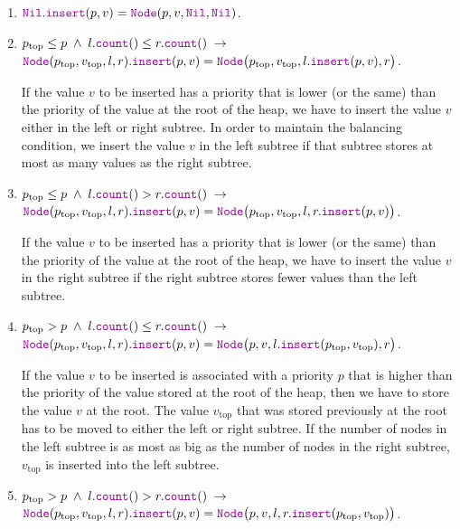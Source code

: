 \begin{enumerate}
\item $\mytt{Nil}.\mytt{insert}(p,v) = \mytt{Node}(p,v,\mytt{Nil}, \mytt{Nil})$.
\item $p_{\mathrm{top}} \leq p \;\wedge\; l.\mytt{count}() \leq r.\mytt{count}() \;\rightarrow $   \\[0.1cm]
      \hspace*{1.3cm} 
      $\mytt{Node}(p_{\mathrm{top}},v_\mathrm{top},l,r).\mytt{insert}(p,v) =
                 \mytt{Node}\bigl(p_\mathrm{top},v_\mathrm{top},l.\mytt{insert}(p,v), r\bigr)$.
                 
      If the value $v$ to be inserted has a priority that is lower (or the same) than the priority of
      the value at the root of the heap, we have to insert the value $v$ either in the left or right
      subtree.  In order to maintain the balancing condition, we insert the value $v$ in the left
      subtree if that subtree stores at most as many values as the right subtree.
\item $p_{\mathrm{top}} \leq p \;\wedge\; l.\mytt{count}() > r.\mytt{count}() \;\rightarrow $   \\[0.1cm]
      \hspace*{1.3cm} 
      $\mytt{Node}(p_{\mathrm{top}},v_\mathrm{top},l,r).\mytt{insert}(p,v) =
                 \mytt{Node}\bigl(p_\mathrm{top},v_\mathrm{top},l,r.\mytt{insert}(p,v)\bigr)$.

      If the value $v$ to be inserted has a priority that is lower (or the same) than the priority of
      the value at the root of the heap, we have to insert the value $v$ in the right
      subtree if the right subtree  stores fewer values than the left subtree.
\item $p_{\mathrm{top}} > p \;\wedge\; l.\mytt{count}() \leq r.\mytt{count}() \;\rightarrow $ \\[0.1cm]
      \hspace*{1.3cm} 
      $\mytt{Node}(p_{\mathrm{top}},v_\mathrm{top},l,r).\mytt{insert}(p,v) =
                 \mytt{Node}\bigl(p,v,l.\mytt{insert}(p_\mathrm{top},v_\mathrm{top}), r\bigr)$.

      If the value $v$ to be inserted is associated with a priority $p$ that is higher than the priority of
      the value stored at the root of the heap, then we have to store the value $v$ at the root.
      The value $v_\mathrm{top}$ that was stored previously at the root has to be moved to either
      the left or right subtree.  If the number of nodes in the left subtree is as most as big as
      the number of nodes in the right subtree, $v_\mathrm{top}$ is inserted into the left subtree.
\item $p_{\mathrm{top}} > p \;\wedge\; l.\mytt{count}() > r.\mytt{count}() \;\rightarrow $ \\[0.1cm] 
      \hspace*{1.3cm} 
      $\mytt{Node}(p_{\mathrm{top}},v_\mathrm{top},l,r).\mytt{insert}(p,v) =
                 \mytt{Node}\bigl(p,v,l,r.\mytt{insert}(p_\mathrm{top},v_\mathrm{top})\bigr)$.


\end{enumerate}
